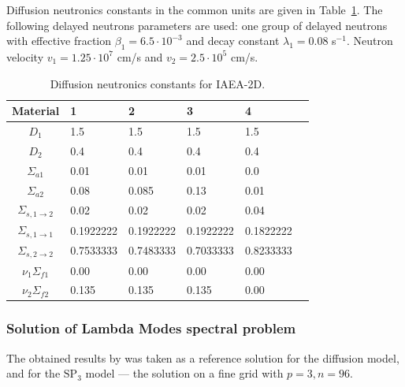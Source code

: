 \documentclass[authoryear]{elsarticle}
\begin{document}
Diffusion neutronics constants in the common units are given in Table~\ref{tab:iaea}.
The following delayed neutrons parameters are used: one group of delayed neutrons with effective fraction $\beta_1 = 6.5\cdot10^{-3}$ and decay constant $\lambda_1 = 0.08$ s$^{-1}$. 
Neutron velocity  $v_1 = 1.25 \cdot 10^7$ cm/s and $v_2 = 2.5 \cdot 10^5$ cm/s.

\begin{table}[h]
\caption{Diffusion neutronics constants for IAEA-2D.}
\label{tab:iaea}
\begin{center}
\begin{tabular}{c l l l l l}
\hline
Material & 1 & 2 & 3 & 4\\
\hline 
$D_1$ & 1.5 & 1.5 & 1.5 & 1.5\\
$D_2$ & 0.4 & 0.4 & 0.4 & 0.4\\
$\Sigma_{a1}$ & 0.01 & 0.01 & 0.01 & 0.0\\
$\Sigma_{a2}$ & 0.08 & 0.085 & 0.13 & 0.01\\
$\Sigma_{s,1\rightarrow2}$ & 0.02 & 0.02 & 0.02 & 0.04\\
$\Sigma_{s,1\rightarrow1}$ & 0.1922222 & 0.1922222 & 0.1922222 & 0.1822222\\
$\Sigma_{s,2\rightarrow2}$ & 0.7533333 & 0.7483333 & 0.7033333 & 0.8233333\\
$\nu_1\Sigma_{f1}$ & 0.00 & 0.00 & 0.00 & 0.00\\
$\nu_2\Sigma_{f2}$ & 0.135 & 0.135 & 0.135 & 0.00\\
\hline
\end{tabular}
\end{center}
\end{table}

\subsubsection{Solution of Lambda Modes spectral problem}
The obtained results by \citep{avvakumov2014} was taken as a reference solution for the diffusion model, and for the $\mathrm{SP_3}$ model --- the solution on a fine grid with $p = 3, n = 96$.
\end{document}
